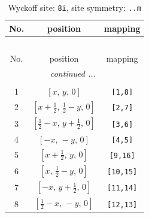 \documentclass[fleqn,8pt]{jsarticle}
\begin{document}
\begin{longtable}{ccc}
\caption{Wyckoff site: {\tt 8i}, site symmetry: {\tt ..m}}
 \\
 \hline \hline
No. & position & mapping \\ \hline \endfirsthead

\multicolumn{2}{l}{\tablename\ \thetable{}} \\
 \hline \hline
No. & position & mapping \\ \hline \endhead

 \hline \hline
\multicolumn{2}{r}{\footnotesize\it continued ...} \\ \endfoot

 \hline \hline
\multicolumn{2}{r}{} \\ \endlastfoot

1 & $\left[ x,\, y,\, 0 \right]$ & {\tt [1,8]} \\ \hline
2 & $\left[ x + \frac{1}{2},\, \frac{1}{2} - y,\, 0 \right]$ & {\tt [2,7]} \\ \hline
3 & $\left[ \frac{1}{2} - x,\, y + \frac{1}{2},\, 0 \right]$ & {\tt [3,6]} \\ \hline
4 & $\left[ - x,\, - y,\, 0 \right]$ & {\tt [4,5]} \\ \hline
5 & $\left[ x + \frac{1}{2},\, y,\, 0 \right]$ & {\tt [9,16]} \\ \hline
6 & $\left[ x,\, \frac{1}{2} - y,\, 0 \right]$ & {\tt [10,15]} \\ \hline
7 & $\left[ - x,\, y + \frac{1}{2},\, 0 \right]$ & {\tt [11,14]} \\ \hline
8 & $\left[ \frac{1}{2} - x,\, - y,\, 0 \right]$ & {\tt [12,13]} \\
\end{longtable}
\renewcommand{\arraystretch}{1.2}
\end{document}
